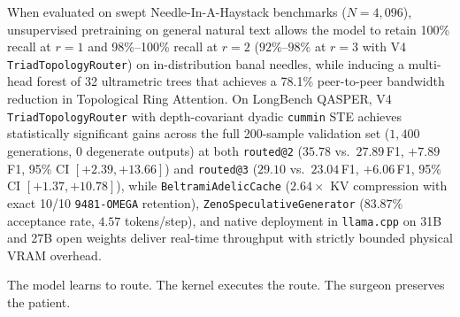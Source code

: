 \documentclass[11pt,a4paper]{article}
\begin{document}
When evaluated on swept Needle-In-A-Haystack benchmarks ($N=4{,}096$), unsupervised pretraining on general natural text allows the model to retain 100\% recall at $r=1$ and 98\%--100\% recall at $r=2$ ($92\%$--$98\%$ at $r=3$ with V4 \texttt{TriadTopologyRouter}) on in-distribution banal needles, while inducing a multi-head forest of 32 ultrametric trees that achieves a 78.1\% peer-to-peer bandwidth reduction in Topological Ring Attention. On LongBench QASPER, V4 \texttt{TriadTopologyRouter} with depth-covariant dyadic \texttt{cummin} STE achieves statistically significant gains across the full 200-sample validation set ($1{,}400$ generations, 0 degenerate outputs) at both \texttt{routed@2} ($35.78$ vs.\ $27.89$\,F1, $+7.89$\,F1, 95\% CI $[+2.39, +13.66]$) and \texttt{routed@3} ($29.10$ vs.\ $23.04$\,F1, $+6.06$\,F1, 95\% CI $[+1.37, +10.78]$), while \texttt{BeltramiAdelicCache} ($2.64\times$ KV compression with exact 10/10 \texttt{9481-OMEGA} retention), \texttt{ZenoSpeculativeGenerator} ($83.87\%$ acceptance rate, $4.57$ tokens/step), and native deployment in \texttt{llama.cpp} on 31B and 27B open weights deliver real-time throughput with strictly bounded physical VRAM overhead.

The model learns to route. The kernel executes the route. The surgeon preserves the patient.


\end{document}
